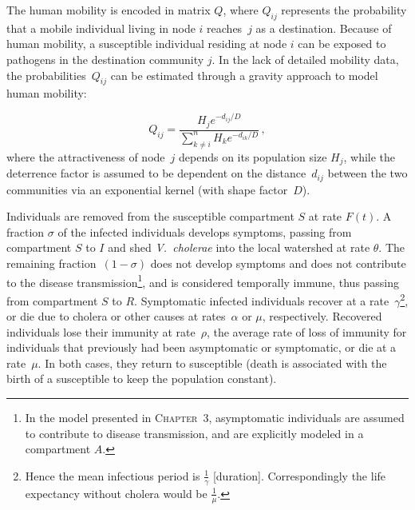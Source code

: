 The human mobility is encoded in matrix $Q$, where $Q_{ij}$ represents the probability that a mobile individual living in node $i$ reaches~$j$ as a destination. Because of human mobility, a susceptible individual residing at node $i$ can be exposed to pathogens in the destination community $j$. 
In the lack of detailed mobility data,  the probabilities~$Q_{ij}$ can be estimated through a gravity approach\cite{Erlander:GravityModelTransportation:1990} to model human mobility:

\begin{equation}
Q_{ij} = \frac{H_j e^{-d_{ij}/D}}{\sum_{k \neq i}^n H_k e^{-d_{ik}/D}} \, ,
\label{eq:mob}
\end{equation}
where the attractiveness of node~$j$ depends on its population size $H_j$, while the deterrence factor is assumed to be dependent on the distance~$d_{ij}$ between the two communities via an exponential kernel (with shape factor~$D$).  

Individuals are removed from the susceptible compartment $S$ at rate $F(t)$.  A fraction $\sigma$ of the infected individuals develops symptoms, passing from compartment $S$ to $I$ and shed \textit{V.~cholerae} into the local watershed at rate $\theta$.  The remaining fraction~$(1-\sigma)$ does not develop symptoms and does not contribute to the disease transmission\footnote{In the model presented in \textsc{Chapter~3}, asymptomatic individuals are assumed to contribute to disease transmission, and are explicitly modeled in a compartment $A$.}, and is considered temporally immune, thus passing from compartment $S$ to $R$.  Symptomatic infected individuals recover at a rate~$\gamma$\footnote{Hence the mean infectious period is $\frac{1}{\gamma}$ [duration]. Correspondingly the life expectancy without cholera would be $\frac{1}{\mu}$.}, or die due to cholera or other causes at rates~$\alpha$ or $\mu$, respectively.
Recovered individuals lose their immunity at rate~$\rho$, the average rate of loss of immunity for individuals that previously had been asymptomatic or symptomatic, or die at a rate~$\mu$. In both cases, they return to susceptible (death is associated with the birth of a susceptible to keep the population constant).

